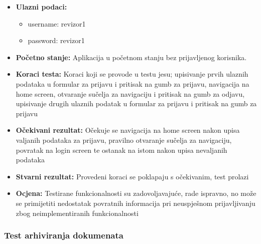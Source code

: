 			\begin{itemize}
				
				\item{\textbf{Ulazni podaci:}}
				\begin{itemize}
					\item{username: revizor1}
					\item{password: revizor1}
				\end{itemize}
				
				\item{\textbf{Početno stanje:} Aplikacija u početnom stanju bez prijavljenog korisnika.}
				
				\item{\textbf{Koraci testa:} Koraci koji se provode u testu jesu; upisivanje prvih ulaznih podataka u formular za prijavu i pritisak na gumb za prijavu, navigacija na home screen, otvaranje sučelja za navigaciju i pritisak na gumb za odjavu, upisivanje drugih ulaznih podatak u formular za prijavu i pritisak na gumb za prijavu}
				
				\item{\textbf{Očekivani rezultat:} Očekuje se navigacija na home screen nakon upisa valjanih podataka za prijavu, pravilno otvaranje sučelja za navigaciju, povratak na login screen te ostanak na istom nakon upisa nevaljanih podataka}
				
				\item{\textbf{Stvarni rezultat:} Provedeni koraci se poklapaju s očekivanim, test prolazi}
				
				\item{\textbf{Ocjena:} Testirane funkcionalnosti su zadovoljavajuće, rade ispravno, no može se primijetiti nedostatak povratnih informacija pri neuspješnom prijavljivanju zbog neimplementiranih funkcionalnosti}
				
			\end{itemize}
			
			\subsubsection{Test arhiviranja dokumenata}
			
